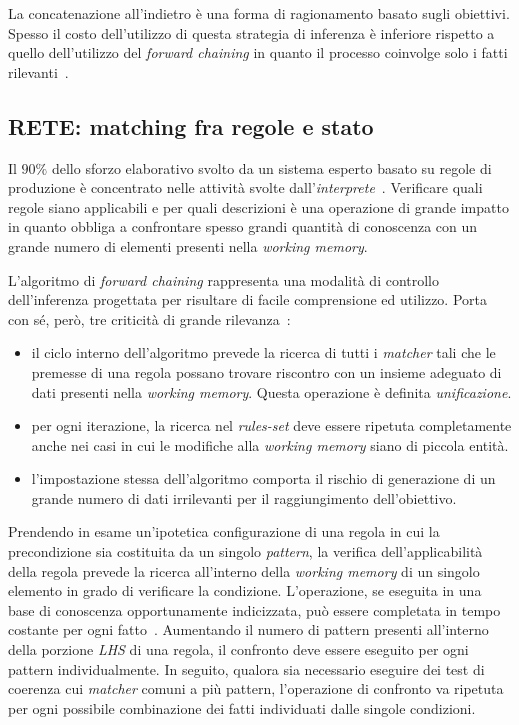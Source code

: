 La concatenazione all'indietro è una forma di ragionamento basato sugli obiettivi. Spesso il costo dell'utilizzo di questa strategia di inferenza è inferiore rispetto a quello dell'utilizzo del \emph{forward chaining} in quanto il processo coinvolge solo i fatti rilevanti~\cite{russellnorvig2009}.

\subsection{RETE: matching fra regole e stato}

Il $90\%$ dello sforzo elaborativo svolto da un sistema esperto basato su regole di produzione è concentrato nelle attività svolte dall'\emph{interprete}~\cite{forgy1982}. Verificare quali regole siano applicabili e per quali descrizioni è una operazione di grande impatto in quanto obbliga a confrontare spesso grandi quantità di conoscenza con un grande numero di elementi presenti nella \emph{working memory}.

L'algoritmo di \emph{forward chaining} rappresenta una modalità di controllo dell'inferenza progettata per risultare di facile comprensione ed utilizzo. Porta con sé, però, tre criticità di grande rilevanza~\cite{russellnorvig2009}:
\begin{itemize}
	\item il ciclo interno dell'algoritmo prevede la ricerca di tutti i \emph{matcher} tali che le premesse di una regola possano trovare riscontro con un insieme adeguato di dati presenti nella \emph{working memory}. Questa operazione è definita \emph{unificazione}.
	\item per ogni iterazione, la ricerca nel \emph{rules-set} deve essere ripetuta completamente anche nei casi in cui le modifiche alla \emph{working memory} siano di piccola entità.
	\item l'impostazione stessa dell'algoritmo comporta il rischio di generazione di un grande numero di dati irrilevanti per il raggiungimento dell'obiettivo.
\end{itemize}

Prendendo in esame un'ipotetica configurazione di una regola in cui la precondizione sia costituita da un singolo \emph{pattern}, la verifica dell'applicabilità della regola prevede la ricerca all'interno della \emph{working memory} di un singolo elemento in grado di verificare la condizione. L'operazione, se eseguita in una base di conoscenza opportunamente indicizzata, può essere completata in tempo costante per ogni fatto~\cite{russellnorvig2009}.
Aumentando il numero di pattern presenti all'interno della porzione \emph{LHS} di una regola, il confronto deve essere eseguito per ogni pattern individualmente. In seguito, qualora sia necessario eseguire dei test di coerenza cui \emph{matcher} comuni a più pattern, l'operazione di confronto va ripetuta per ogni possibile combinazione dei fatti individuati dalle singole condizioni.

